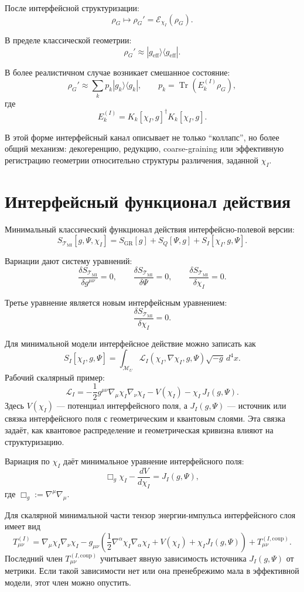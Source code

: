 \documentclass[12pt,a4paper]{article}
\DeclareMathOperator{\Tr}{Tr}
\newcommand{\TMI}{\mathcal T_{\mathrm{MI}}}
\newcommand{\M}{\mathcal M_U}
\newcommand{\Eff}{\mathrm{eff}}
\newcommand{\Lag}{\mathcal L}
\begin{document}
После интерфейсной структуризации:
\[
\boxed{
\rho_G\longmapsto \rho_G'=
\mathcal E_{\chi_I}(\rho_G).
}
\]

В пределе классической геометрии:
\[
\boxed{
\rho_G'
\approx
|g_{\Eff}\rangle\langle g_{\Eff}|.
}
\]

В более реалистичном случае возникает смешанное состояние:
\[
\boxed{
\rho_G'
\approx
\sum_k p_k |g_k\rangle\langle g_k|,
\qquad
p_k=\Tr(E_k^{(I)}\rho_G),
}
\]
где
\[
E_k^{(I)}=K_k[\chi_I,g]^{\dagger}K_k[\chi_I,g].
\]

В этой форме интерфейсный канал описывает не только ``коллапс'', но более общий механизм: декогеренцию, редукцию, coarse-graining или эффективную регистрацию геометрии относительно структуры различения, заданной $\chi_I$.

\section{Интерфейсный функционал действия}

Минимальный классический функционал действия интерфейсно-полевой версии:
\[
\boxed{
S_{\TMI}[g,\Psi,\chi_I]
=
S_{\mathrm{GR}}[g]
+
S_Q[\Psi,g]
+
S_I[\chi_I,g,\Psi].
}
\]

Вариации дают систему уравнений:
\[
\boxed{
\frac{\delta S_{\TMI}}{\delta g^{\mu\nu}}=0,
\qquad
\frac{\delta S_{\TMI}}{\delta \Psi}=0,
\qquad
\frac{\delta S_{\TMI}}{\delta \chi_I}=0.
}
\]

Третье уравнение является новым интерфейсным уравнением:
\[
\boxed{
\frac{\delta S_{\TMI}}{\delta \chi_I}=0.
}
\]

Для минимальной модели интерфейсное действие можно записать как
\[
\boxed{
S_I[\chi_I,g,\Psi]
=
\int_{\M}
\Lag_I(\chi_I,\nabla\chi_I,g,\Psi)\sqrt{-g}\,d^4x.
}
\]
Рабочий скалярный пример:
\[
\boxed{
\Lag_I
=
-\frac{1}{2}g^{\mu\nu}\nabla_\mu\chi_I\nabla_\nu\chi_I
-
V(\chi_I)
-
\chi_I\,J_I(g,\Psi).
}
\]
Здесь $V(\chi_I)$ --- потенциал интерфейсного поля, а $J_I(g,\Psi)$ --- источник или связка интерфейсного поля с геометрическим и квантовым слоями. Эта связка задаёт, как квантовое распределение и геометрическая кривизна влияют на структуризацию.

Вариация по $\chi_I$ даёт минимальное уравнение интерфейсного поля:
\[
\boxed{
\Box_g\chi_I
-
\frac{dV}{d\chi_I}
=
J_I(g,\Psi),
}
\]
где $\Box_g:=\nabla^\mu\nabla_\mu$.

Для скалярной минимальной части тензор энергии-импульса интерфейсного слоя имеет вид
\[
\boxed{
T_{\mu\nu}^{(I)}
=
\nabla_\mu\chi_I\nabla_\nu\chi_I
-
g_{\mu\nu}
\left(
\frac{1}{2}\nabla^\alpha\chi_I\nabla_\alpha\chi_I
+
V(\chi_I)
+
\chi_I J_I(g,\Psi)
\right)
+
T_{\mu\nu}^{(I,\mathrm{coup})}.
}
\]
Последний член $T_{\mu\nu}^{(I,\mathrm{coup})}$ учитывает явную зависимость источника $J_I(g,\Psi)$ от метрики. Если такой зависимости нет или она пренебрежимо мала в эффективной модели, этот член можно опустить.
\end{document}

